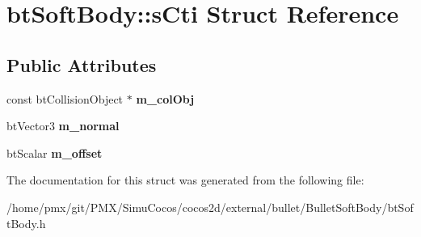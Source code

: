 \hypertarget{structbtSoftBody_1_1sCti}{}\section{bt\+Soft\+Body\+:\+:s\+Cti Struct Reference}
\label{structbtSoftBody_1_1sCti}
\subsection*{Public Attributes}
\begin{DoxyCompactItemize}
\item 
\mbox{\label{structbtSoftBody_1_1sCti_a2ec6effa23b4f92a44f17477f254078f}} 
const bt\+Collision\+Object $\ast$ {\bfseries m\+\_\+col\+Obj}
\item 
\mbox{\label{structbtSoftBody_1_1sCti_ae668ef16af4314e979f47d1ab28fc5f9}} 
bt\+Vector3 {\bfseries m\+\_\+normal}
\item 
\mbox{\label{structbtSoftBody_1_1sCti_ac3028faa276435d90944dd2b72b533b8}} 
bt\+Scalar {\bfseries m\+\_\+offset}
\end{DoxyCompactItemize}


The documentation for this struct was generated from the following file\+:\begin{DoxyCompactItemize}
\item 
/home/pmx/git/\+P\+M\+X/\+Simu\+Cocos/cocos2d/external/bullet/\+Bullet\+Soft\+Body/bt\+Soft\+Body.\+h\end{DoxyCompactItemize}
